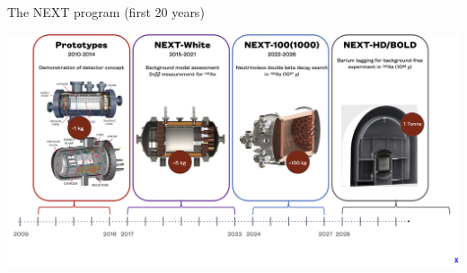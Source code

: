 \documentclass [aspectratio=169]{beamer}
\newcommand{\XE}{\ensuremath{{}^{136}{\rm Xe}}}
\begin{document}
\begin{frame}{The NEXT program (first 20 years)}

\includegraphics[scale=0.23]{nextprogram.png}

\end{frame}


%
%
%
%
%
%
%
%
%
%
%
%


%
%


%
%
\end{document}
